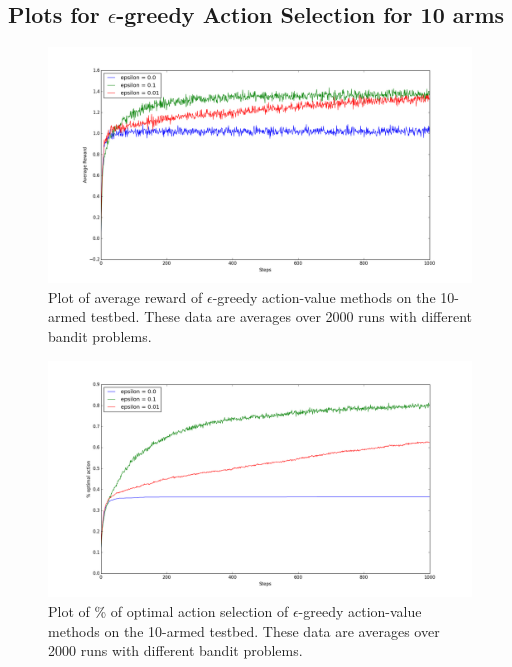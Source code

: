 \documentclass[english]{article}
\begin{document}
\subsection{Plots for $\epsilon$-greedy Action Selection for 10 arms}
\begin{figure}[H]
  \includegraphics[width=\linewidth]{epsilon_greedy_average_reward.png}
  \caption{Plot of average reward of $\epsilon$-greedy action-value methods on the 10-armed testbed. These data are averages over 2000 runs with different bandit problems.}
  \label{fig:eg1}
\end{figure}

\begin{figure}[H]
  \includegraphics[width=\linewidth]{epsilon_greedy_optimal_action.png}
  \caption{Plot of \% of optimal action selection of $\epsilon$-greedy action-value methods on the 10-armed testbed. These data are averages over 2000 runs with different bandit problems.}
  \label{fig:eg1}
\end{figure}
\end{document}
